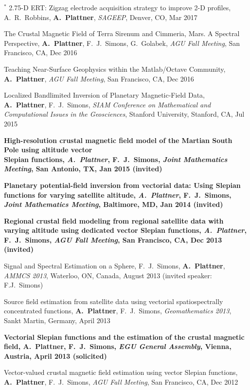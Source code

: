 \documentclass[10pt]{article}
\begin{document}
\spcp 
\hspace{-0.4cm} $^*$ 2.75-D ERT: Zigzag electrode acquisition strategy
to improve 2-D profiles,
A.~R.~Robbins, \textbf{A.~Plattner},
\emph{SAGEEP}, Denver, CO, Mar 2017

\spcp
The Crustal Magnetic Field of Terra Sirenum and Cimmeria, Mars. A Spectral Perspective,
\textbf{A.~Plattner}, F.~J.~Simons, G.~Golabek, 
\emph{AGU Fall Meeting}, San Francisco, CA, Dec 2016

\spcp
Teaching Near-Surface Geophysics within the Matlab/Octave Community,
\textbf{A.~Plattner}, 
\emph{AGU Fall Meeting}, San Francisco, CA, Dec 2016

\spcp
Localized Bandlimited Inversion of Planetary Magnetic-Field Data,
\textbf{A.~Plattner}, F.~J.~Simons,
\emph{SIAM Conference on Mathematical and Computational Issues in the Geosciences},
Stanford University, Stanford, CA, Jul 2015


\spcp
\textbf{High-resolution crustal magnetic field model of the Martian South Pole using altitude vector\\ Slepian functions,
\emph{A.~Plattner}, F.~J.~Simons,
\emph{Joint Mathematics Meeting}, San Antonio, TX, Jan 2015 (invited)}

\spcp
\textbf{Planetary potential-field inversion from vectorial data: Using Slepian functions for varying satellite altitude,
\emph{A.~Plattner}, F.~J.~Simons,
\emph{Joint Mathematics Meeting}, Baltimore, MD, Jan 2014 (invited)}

\spcp
\textbf{Regional crustal field modeling from regional satellite data with varying altitude using dedicated vector Slepian functions,
\emph{A.~Plattner}, F.~J.~Simons,
\emph{AGU Fall Meeting}, San Francisco, CA, Dec 2013 (invited)}

\spcp
Signal and Spectral Estimation on a Sphere,
F.~J.~Simons, \textbf{A.~Plattner},
\emph{AMMCS 2013}, Waterloo, ON, Canada, August 2013 (invited speaker: F.J.~Simons)

\spcp
Source field estimation from satellite data using vectorial spatiospectrally 
concentrated functions,
\textbf{A.~Plattner}, F.~J.~Simons,
\emph{Geomathematics 2013}, Sankt Martin, Germany, April 2013

\spcp
\textbf{Vectorial Slepian functions and the estimation of the crustal magnetic field,
A.~Plattner, F.~J.~Simons,
\emph{EGU General Assembly}, Vienna, Austria, April 2013 (solicited)}

\spcp
Vector-valued crustal magnetic field estimation using vector Slepian functions,
\textbf{A.~Plattner}, F.~J.~Simons,
\emph{AGU Fall Meeting}, San Francisco, CA, Dec 2012
\end{document}
